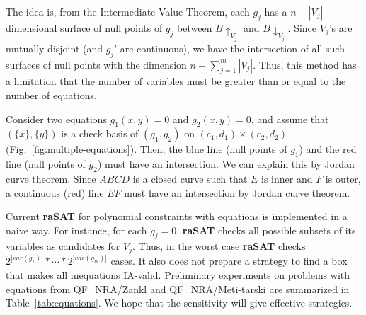 \documentclass[runningheads,a4paper,oribibl]{llncs}
\begin{document}
The idea is, from the Intermediate Value Theorem,
each $g_j$ has a $n - |V_{j}|$ dimensional surface of null points of $g_j$
between $B\uparrow_{V_j}$ and $B\downarrow_{V_j}$. 
Since $V_j$'s are mutually disjoint (and $g_j$' are continuous),
we have the intersection of all such surfaces of null points with
the dimension $n - \sum_{j=1}^m |V_j|$.
Thus, this method has a limitation that 
the number of variables must be greater than or equal to the number of equations.

\begin{example}
  Consider two equations $g_1(x, y)=0$ and $g_2(x, y) = 0$, and assume that $(\{x\}, \{y\})$
  is a check basis of $(g_1, g_2)$ on $(c_1,d_1) \times (c_2,d_2)$ (Fig.~\ref{fig:multiple-equations}).
  Then, the blue line (null points of $g_1$) and the red line (null points of $g_2$) must have
  an intersection. We can explain this by Jordan curve theorem. 
  Since $ABCD$ is a closed curve such that $E$ is inner and $F$ is outer,
  a continuous (red) line $EF$ must have an intersection by Jordan curve theorem. 
\end{example}

Current {\bf raSAT} for polynomial constraints with equations is implemented in a naive way. 
For instance, for each $g_j = 0$, \textbf{raSAT} checks all possible subsets of its variables
as candidates for $V_j$. Thus, in the worst case \textbf{raSAT} checks
$2^{|var(g_1)|}*\cdots*2^{|var(g_m)|}$ cases.
It also does not prepare a strategy to find a box that makes all inequations IA-valid.
Preliminary experiments on problems with equations from QF\_NRA/Zankl and QF\_NRA/Meti-tarski
are summarized in Table~\ref{tab:equations}.
We hope that the sensitivity will give effective strategies. 
\end{document}
